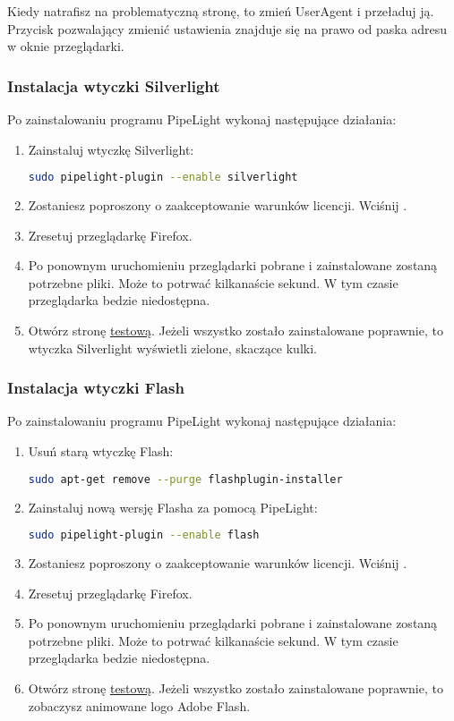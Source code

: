 Kiedy natrafisz na problematyczną stronę, to zmień UserAgent i przeładuj ją. Przycisk pozwalający zmienić ustawienia znajduje się na prawo od paska adresu w oknie przeglądarki.

\subsubsection{Instalacja wtyczki Silverlight}
\noindent Po zainstalowaniu programu PipeLight wykonaj następujące działania:
\begin{enumerate}
\item Zainstaluj wtyczkę Silverlight:
\begin{lstlisting}[language=bash]
sudo pipelight-plugin --enable silverlight
\end{lstlisting}
\item Zostaniesz poproszony o zaakceptowanie warunków licencji. Wciśnij .
\item Zresetuj przeglądarkę Firefox.
\item Po ponownym uruchomieniu przeglądarki pobrane i zainstalowane zostaną potrzebne pliki. Może to potrwać kilkanaście sekund. W tym czasie przeglądarka bedzie niedostępna.
\item Otwórz stronę \href{http://bubblemark.com/silverlight2.html}{testową}. Jeżeli wszystko zostało zainstalowane poprawnie, to wtyczka Silverlight wyświetli zielone, skaczące kulki.
\end{enumerate}

\subsubsection{Instalacja wtyczki Flash}
\noindent Po zainstalowaniu programu PipeLight wykonaj następujące działania:
\begin{enumerate}
\item Usuń starą wtyczkę Flash:
\begin{lstlisting}[language=bash]
sudo apt-get remove --purge flashplugin-installer
\end{lstlisting}
\item Zainstaluj nową wersję Flasha za pomocą PipeLight:
\begin{lstlisting}[language=bash]
sudo pipelight-plugin --enable flash
\end{lstlisting}
\item Zostaniesz poproszony o zaakceptowanie warunków licencji. Wciśnij .
\item Zresetuj przeglądarkę Firefox.
\item Po ponownym uruchomieniu przeglądarki pobrane i zainstalowane zostaną potrzebne pliki. Może to potrwać kilkanaście sekund. W tym czasie przeglądarka bedzie niedostępna.
\item Otwórz stronę \href{https://www.adobe.com/software/flash/about/}{testową}. Jeżeli wszystko zostało zainstalowane poprawnie, to zobaczysz animowane logo Adobe Flash.
\end{enumerate}


